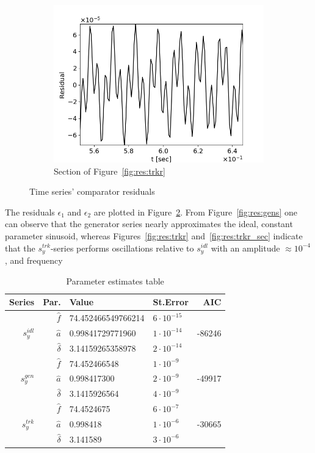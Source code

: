 \documentclass[a4paper]{jacow}
\begin{document}
\begin{figure}[h]
\begin{subfigure}{\linewidth}
    \includegraphics[width=\linewidth]{../img/IPAC19/TRK-IDL_RESIDUAL_section}
    \caption{Section of Figure~\ref{fig:res:trkr}\label{fig:tres:trkr_sec}}
  \end{subfigure}
    \caption{Time series' comparator residuals\label{fig:residuals}}
\end{figure}

The residuals $\epsilon_1$ and $\epsilon_2$ are plotted in Figure~\ref{fig:residuals}.
From Figure~\ref{fig:res:gens} one can observe that the generator series nearly approximates the ideal,
constant parameter sinusoid, whereas Figures~\ref{fig:res:trkr} and~\ref{fig:res:trkr_sec} indicate
that the $s_y^{trk}$-series performs oscillations relative to $s_y^{idl}$ with an amplitude
$\approx 10^{-4}$, and frequency 


\begin{table}[h]
  \caption{Parameter estimates table\label{tbl:param_estimates}}
  \begin{tabular}{r|rllr}
    \toprule
    Series & Par. & Value & St.Error & AIC \\
    \midrule
    \multirow{3}{*}{$s_y^{idl}$} & $\hat f$ & 74.452466549766214 & $6\cdot10^{-15}$ & \multirow{3}{*}{-86246} \\
    & $\hat a$ & 0.99841729771960 & $1\cdot10^{-14}$ & \\
    & $\hat\delta$ & 3.14159265358978 & $2\cdot 10^{-14}$ &\\
    \hline
    \multirow{3}{*}{$s_y^{gen}$} & $\hat f$ & 74.452466548 & $1\cdot 10^{-9}$ & \multirow{3}{*}{-49917} \\
    & $\hat a$ & 0.998417300 & $2\cdot 10^{-9}$ & \\
    & $\hat\delta$ & 3.1415926564 & $4\cdot 10^{-9}$ &\\
    \hline
    \multirow{3}{*}{$s_y^{trk}$} & $\hat f$ & 74.4524675 & $6\cdot 10^{-7}$ & \multirow{3}{*}{-30665} \\
    & $\hat a$ & 0.998418 & $1\cdot10^{-6}$ & \\
    & $\hat\delta$ & 3.141589 & $3\cdot 10^{-6}$ &\\
    \bottomrule
  \end{tabular}
\end{table}
\end{document}
